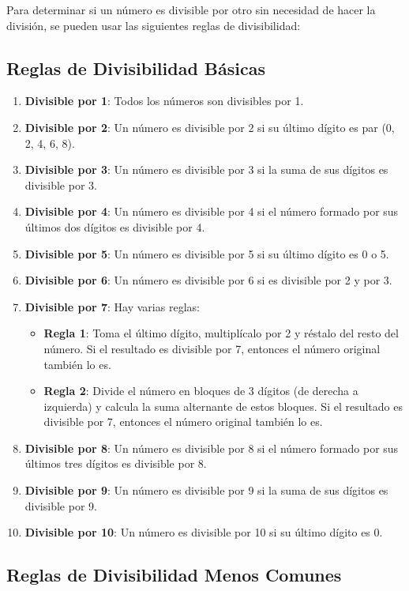 Para determinar si un número es divisible por otro sin necesidad de hacer la división, se pueden usar las siguientes reglas de divisibilidad:

\subsection{Reglas de Divisibilidad Básicas}

\begin{enumerate}
	\item \textbf{Divisible por 1}: Todos los números son divisibles por 1.
	\item \textbf{Divisible por 2}: Un número es divisible por 2 si su último dígito es par (0, 2, 4, 6, 8).
	\item \textbf{Divisible por 3}: Un número es divisible por 3 si la suma de sus dígitos es divisible por 3.
	\item \textbf{Divisible por 4}: Un número es divisible por 4 si el número formado por sus últimos dos dígitos es divisible por 4.
	\item \textbf{Divisible por 5}: Un número es divisible por 5 si su último dígito es 0 o 5.
	\item \textbf{Divisible por 6}: Un número es divisible por 6 si es divisible por 2 y por 3.
	\item \textbf{Divisible por 7}: Hay varias reglas:
	\begin{itemize}
		\item \textbf{Regla 1}: Toma el último dígito, multiplícalo por 2 y réstalo del resto del número. Si el resultado es divisible por 7, entonces el número original también lo es.
		\item \textbf{Regla 2}: Divide el número en bloques de 3 dígitos (de derecha a izquierda) y calcula la suma alternante de estos bloques. Si el resultado es divisible por 7, entonces el número original también lo es.
	\end{itemize}
	\item \textbf{Divisible por 8}: Un número es divisible por 8 si el número formado por sus últimos tres dígitos es divisible por 8.
	\item \textbf{Divisible por 9}: Un número es divisible por 9 si la suma de sus dígitos es divisible por 9.
	\item \textbf{Divisible por 10}: Un número es divisible por 10 si su último dígito es 0.
\end{enumerate}

\subsection{Reglas de Divisibilidad Menos Comunes}

